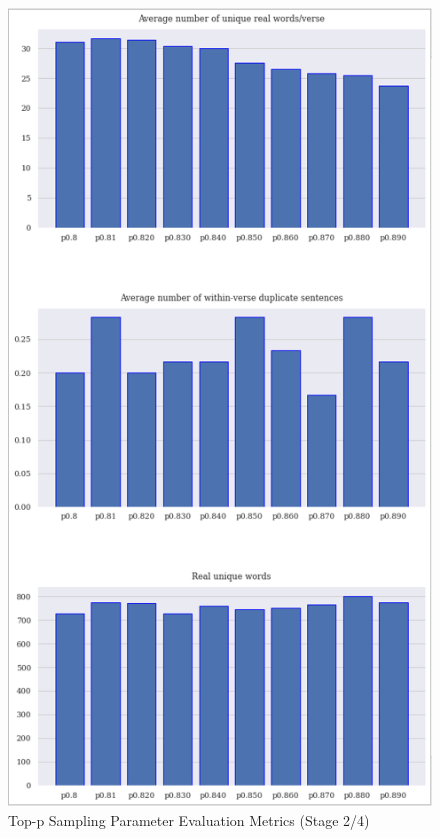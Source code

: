 \begin{figure}[h]
    \centering
    \includegraphics[scale=0.85,keepaspectratio=true]{figures/top-p_param_eval_s2.png}
    \caption{Top-p Sampling Parameter Evaluation Metrics (Stage 2/4)}
    \label{fig:top-p-param-eval-s2}
\end{figure}

